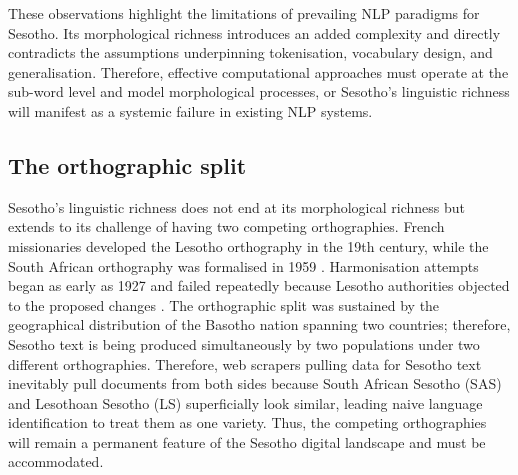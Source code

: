 \documentclass[12pt]{ThesisRU}
\begin{document}
These observations highlight the limitations of prevailing NLP paradigms for Sesotho. Its morphological richness introduces an added complexity and directly contradicts the assumptions underpinning tokenisation, vocabulary design, and generalisation. Therefore, effective computational approaches must operate at the sub-word level and model morphological processes, or Sesotho's linguistic richness will manifest as a systemic failure in existing NLP systems.

\subsection{The orthographic split}
Sesotho's linguistic richness does not end at its morphological richness but extends to its challenge of having two competing orthographies. French missionaries developed the Lesotho orthography in the 19th century, while the South African orthography was formalised in 1959 \citep{makutoane2022people}. Harmonisation attempts began as early as 1927 and failed repeatedly because Lesotho authorities objected to the proposed changes \citep{matlosa2017sesotho}. The orthographic split was sustained by the geographical distribution of the Basotho nation spanning two countries; therefore, Sesotho text is being produced simultaneously by two populations under two different orthographies. Therefore, web scrapers pulling data for Sesotho text inevitably pull documents from both sides because South African Sesotho (SAS) and Lesothoan Sesotho (LS) superficially look similar, leading naive language identification to treat them as one variety. Thus, the competing orthographies will remain a permanent feature of the Sesotho digital landscape and must be accommodated. 
\end{document}
